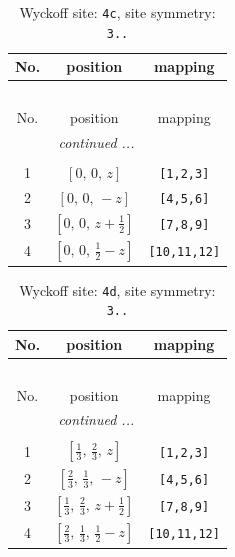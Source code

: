 \documentclass[fleqn,8pt]{jsarticle}
\begin{document}
\begin{longtable}{ccc}
\caption{Wyckoff site: {\tt 4c}, site symmetry: {\tt 3..}}
 \\
 \hline \hline
No. & position & mapping \\ \hline \endfirsthead

\multicolumn{2}{l}{\tablename\ \thetable{}} \\
 \hline \hline
No. & position & mapping \\ \hline \endhead

 \hline \hline
\multicolumn{2}{r}{\footnotesize\it continued ...} \\ \endfoot

 \hline \hline
\multicolumn{2}{r}{} \\ \endlastfoot

1 & $\left[ 0,\, 0,\, z \right]$ & {\tt [1,2,3]} \\ \hline
2 & $\left[ 0,\, 0,\, - z \right]$ & {\tt [4,5,6]} \\ \hline
3 & $\left[ 0,\, 0,\, z + \frac{1}{2} \right]$ & {\tt [7,8,9]} \\ \hline
4 & $\left[ 0,\, 0,\, \frac{1}{2} - z \right]$ & {\tt [10,11,12]} \\
\end{longtable}
\renewcommand{\arraystretch}{1.2}
\begin{longtable}{ccc}
\caption{Wyckoff site: {\tt 4d}, site symmetry: {\tt 3..}}
 \\
 \hline \hline
No. & position & mapping \\ \hline \endfirsthead

\multicolumn{2}{l}{\tablename\ \thetable{}} \\
 \hline \hline
No. & position & mapping \\ \hline \endhead

 \hline \hline
\multicolumn{2}{r}{\footnotesize\it continued ...} \\ \endfoot

 \hline \hline
\multicolumn{2}{r}{} \\ \endlastfoot

1 & $\left[ \frac{1}{3},\, \frac{2}{3},\, z \right]$ & {\tt [1,2,3]} \\ \hline
2 & $\left[ \frac{2}{3},\, \frac{1}{3},\, - z \right]$ & {\tt [4,5,6]} \\ \hline
3 & $\left[ \frac{1}{3},\, \frac{2}{3},\, z + \frac{1}{2} \right]$ & {\tt [7,8,9]} \\ \hline
4 & $\left[ \frac{2}{3},\, \frac{1}{3},\, \frac{1}{2} - z \right]$ & {\tt [10,11,12]} \\
\end{longtable}
\end{document}
